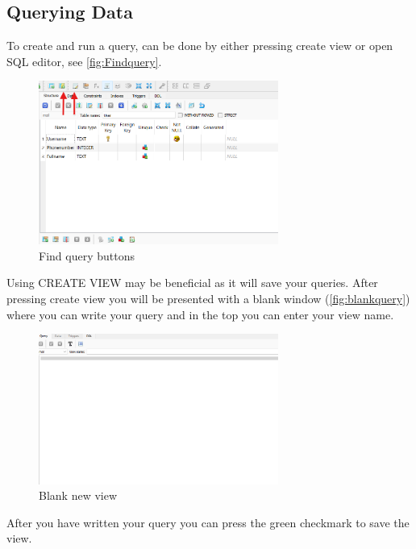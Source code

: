 \documentclass[a4paper,11pt,oneside]{article}
\begin{document}
\begin{sloppypar}
\subsection{Querying Data}
\label{sqliteStudioQueryingData}
To create and run a query, can be done by either pressing create view or open SQL editor, see \autoref{fig:Findquery}.
\begin{figure}[!htb]
  \centering
  \includegraphics[width=0.7\textwidth]{sqlitestudio/queries/create_query_find.png}
  \caption{Find query buttons}
  \label{fig:Findquery}
\end{figure} 
Using CREATE VIEW may be beneficial as it will save your queries. After pressing create view you will be presented with a blank window (\autoref{fig:blankquery}) where you can write your query and in the top you can enter your view name.
\begin{figure}[!htb]
  \centering
  \includegraphics[width=0.7\textwidth]{sqlitestudio/queries/create_query_blank.png}
  \caption{Blank new view}
  \label{fig:blankquery}
\end{figure} 
After you have written your query you can press the green checkmark to save the view. 


\end{sloppypar}
\end{document}

